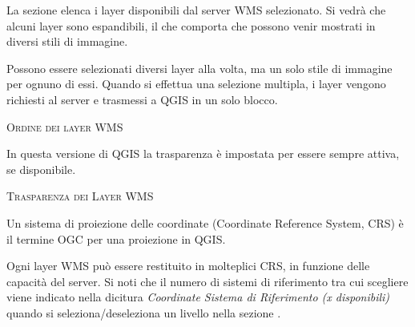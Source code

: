 
La sezione  elenca i layer disponibili dal server WMS
selezionato. Si vedrà che alcuni layer sono espandibili, il che comporta che
possono venir mostrati in diversi stili di immagine.

Possono essere selezionati diversi layer alla volta, ma un solo stile di
immagine per ognuno di essi. Quando si effettua una selezione multipla, i
layer vengono richiesti al server e trasmessi a QGIS in un solo blocco.

\begin{Tip}[ht]\caption{\textsc{Ordine dei layer WMS}}
\end{Tip}

\label{ogc-wms-transparency}

In questa versione di QGIS la trasparenza è impostata per essere sempre
attiva, se disponibile.

\begin{Tip}[ht]\caption{\textsc{Trasparenza dei Layer WMS}}
\end{Tip}


Un sistema di proiezione delle coordinate (Coordinate Reference System, CRS) è
il termine OGC per una proiezione in QGIS.

Ogni layer WMS può essere restituito in molteplici CRS, in funzione delle
capacità del server. Si noti che il numero di sistemi di riferimento tra cui
scegliere viene indicato nella dicitura \textsl{Coordinate Sistema di
Riferimento (x disponibili)} quando si seleziona/deseleziona un livello nella
sezione .

